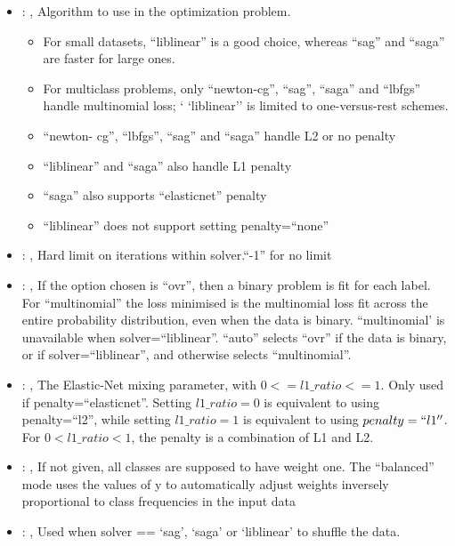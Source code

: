 \begin{itemize}
    \item {}: , 
      Algorithm to use in the optimization problem.
      \begin{itemize}                                                    \item For small datasets,
      ``liblinear'' is a good choice, whereas ``sag'' and ``saga'' are faster for large ones.
      \item For multiclass problems, only ``newton-cg'', ``sag'', ``saga'' and ``lbfgs'' handle
      multinomial loss; `                                                    `liblinear'' is limited
      to one-versus-rest schemes.                                                    \item ``newton-
      cg'', ``lbfgs'', ``sag'' and ``saga'' handle L2 or no penalty
      \item ``liblinear'' and ``saga'' also handle L1 penalty
      \item ``saga'' also supports ``elasticnet'' penalty
      \item ``liblinear'' does not support setting penalty=``none''
      \end{itemize}

    \item {}: , 
      Hard limit on iterations within solver.``-1'' for no limit

    \item {}: , 
      If the option chosen is ``ovr'', then a binary problem is fit for each label. For
      ``multinomial''                                                  the loss minimised is the
      multinomial loss fit across the entire probability distribution, even when the
      data is binary. ``multinomial' is unavailable when solver=``liblinear''. ``auto'' selects
      ``ovr'' if the data is                                                  binary, or if
      solver=``liblinear'', and otherwise selects ``multinomial''.

    \item {}: , 
      The Elastic-Net mixing parameter, with $0 <= l1\_ratio <= 1$. Only used if
      penalty=``elasticnet''.                                                  Setting $l1\_ratio=0$
      is equivalent to using penalty=``l2'', while setting $l1\_ratio=1$ is equivalent to using
      $penalty=``l1''$. For $0 < l1\_ratio <1$, the penalty is a combination of L1 and L2.

    \item {}: \xmlDesc{[balanced]}, 
      If not given, all classes are supposed to have weight one.
      The “balanced” mode uses the values of y to automatically adjust weights
      inversely proportional to class frequencies in the input data

    \item {}: , 
      Used when solver == ‘sag’, ‘saga’ or ‘liblinear’ to shuffle the data.
  \end{itemize}
